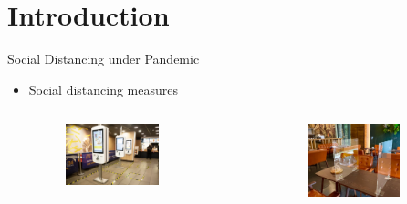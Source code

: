 
\section{Introduction}
\frame{\sectionpage}

\begin{frame}{Social Distancing under Pandemic}
  \begin{itemize}
    \item Social distancing measures
    \begin{columns}[c]  %
      \column{6cm}  %
      \begin{figure}[ht]
        \centering
        \includegraphics[width = 0.7\textwidth]{./images/McDonald.png}
      \end{figure}
      \column{4cm}
      \scriptsize
      \begin{figure}[ht]
        \centering
        \includegraphics[width=0.9\textwidth,height=0.7\textwidth]{./images/res2.jpg}
      \end{figure}
      \end{columns} 


\end{itemize}
\end{frame}
